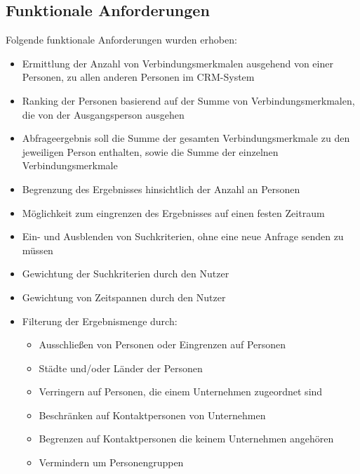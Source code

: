 \subsection{Funktionale Anforderungen}

Folgende funktionale Anforderungen wurden erhoben:

\begin{itemize}
\item Ermittlung der Anzahl von Verbindungsmerkmalen ausgehend von einer Personen, zu allen anderen Personen im CRM-System

\item Ranking der Personen basierend auf der Summe von Verbindungsmerkmalen, die von der Ausgangsperson ausgehen

\item Abfrageergebnis soll die Summe der gesamten Verbindungsmerkmale zu den jeweiligen Person enthalten, sowie die Summe der einzelnen Verbindungsmerkmale

\item Begrenzung des Ergebnisses hinsichtlich der Anzahl an Personen

\item Möglichkeit zum eingrenzen des Ergebnisses auf einen festen Zeitraum

\item Ein- und Ausblenden von Suchkriterien, ohne eine neue Anfrage senden zu müssen

\item Gewichtung der Suchkriterien durch den Nutzer

\item Gewichtung von Zeitspannen durch den Nutzer

\item Filterung der Ergebnismenge durch:	
	\begin{itemize}
	\item Ausschließen von Personen oder Eingrenzen auf Personen
	\item Städte und/oder Länder der Personen
	\item Verringern auf Personen, die einem Unternehmen zugeordnet sind 
	\item Beschränken auf Kontaktpersonen von Unternehmen
	\item Begrenzen auf Kontaktpersonen die keinem Unternehmen angehören
	\item Vermindern um Personengruppen
	\end{itemize}
\end{itemize}

